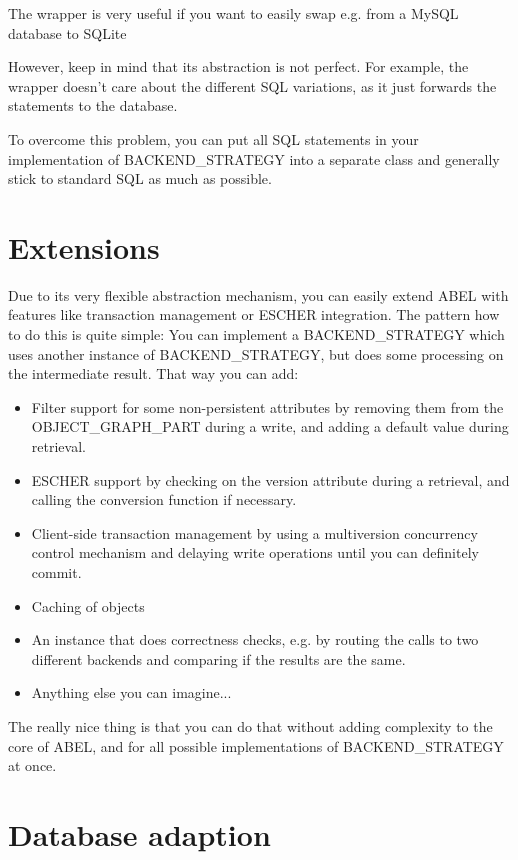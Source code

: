 The wrapper is very useful if you want to easily swap e.g. from a MySQL database to SQLite

However, keep in mind that its abstraction is not perfect. 
For example, the wrapper doesn't care about the different SQL variations, as it just forwards the statements to the database.

To overcome this problem, you can put all SQL statements in your implementation of BACKEND\_STRATEGY into a separate class and generally stick to standard SQL as much as possible.


\section{Extensions}

Due to its very flexible abstraction mechanism, you can easily extend ABEL with features like transaction management or ESCHER  integration.
The pattern how to do this is quite simple: 
You can implement a BACKEND\_STRATEGY which uses another instance of BACKEND\_STRATEGY, but does some processing on the intermediate result.
That way you can add:

\begin{itemize}
 \item Filter support for some non-persistent attributes by removing them from the OBJECT\_GRAPH\_PART during a write, and adding a default value during retrieval.
 \item ESCHER support by checking on the version attribute during a retrieval, and calling the conversion function if necessary.
 \item Client-side transaction management by using a multiversion concurrency control mechanism and delaying write operations until you can definitely commit.
 \item Caching of objects
 \item An instance that does correctness checks, e.g. by routing the calls to two different backends and comparing if the results are the same.
 \item Anything else you can imagine...
\end{itemize}

The really nice thing is that you can do that without adding complexity to the core of ABEL, and for all possible implementations of BACKEND\_STRATEGY at once.


\section{Database adaption}

